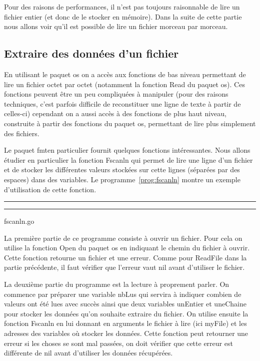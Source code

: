 \documentclass[a4paper]{article}
\newcounter{saveFootnote}
\newcommand{\sourcecode}[3]{\begin{figprog}\begin{center}\begin{minipage}{10cm}\par\noindent\rule{\textwidth}{0.4pt}\par\noindent\rule{\textwidth}{0.4pt}\end{minipage}\end{center}\caption{#1}\label{#3}\end{figprog}}
\newcommand{\inlinecode}[1]{\textsf{#1}}
\begin{document}
Pour des raisons de performances, il n'est pas toujours raisonnable de lire un fichier entier (et donc de le stocker en mémoire).
Dans la suite de cette partie nous allons voir qu'il est possible de lire un fichier morceau par morceau.

\subsection{Extraire des données d'un fichier}

En utilisant le paquet \inlinecode{os} on a accès aux fonctions de bas niveau permettant de lire un fichier octet par octet (notamment la fonction \inlinecode{Read} du paquet \inlinecode{os}).
Ces fonctions peuvent être un peu compliquées à manipuler (pour des raisons techniques, c'est parfois difficile de reconstituer une ligne de texte à partir de celles-ci) cependant on a aussi accès à des fonctions de plus haut niveau, construite à partir des fonctions du paquet \inlinecode{os}, permettant de lire plus simplement des fichiers.

Le paquet \inlinecode{fmt}\footnotemark en particulier fournit quelques fonctions intéressantes.
Nous allons étudier en particulier la fonction \inlinecode{Fscanln} qui permet de lire une ligne d'un fichier et de stocker les différentes valeurs stockées sur cette lignes (séparées par des espaces) dans des variables.
Le programme~\ref{prog:fscanln} montre un exemple d'utilisation de cette fonction.

\sourcecode{fscanln.go}{Extraction de données d'un fichier en Go}{prog:fscanln}

La première partie de ce programme consiste à ouvrir un fichier.
Pour cela on utilise la fonction \inlinecode{Open} du paquet \inlinecode{os} en indiquant le chemin du fichier à ouvrir.
Cette fonction retourne un fichier et une erreur.
Comme pour \inlinecode{ReadFile} dans la partie précédente, il faut vérifier que l'erreur vaut \inlinecode{nil} avant d'utiliser le fichier.

La deuxième partie du programme est la lecture à proprement parler.
On commence par préparer une variable \inlinecode{nbLus} qui servira à indiquer combien de valeurs ont été lues avec succès ainsi que deux variables \inlinecode{unEntier} et \inlinecode{uneChaine} pour stocker les données qu'on souhaite extraire du fichier.
On utilise ensuite la fonction \inlinecode{Fscanln} en lui donnant en arguments le fichier à lire (ici \inlinecode{myFile}) et les adresses des variables où stocker les données.
Cette fonction peut retourner une erreur si les choses se sont mal passées, on doit vérifier que cette erreur est différente de \inlinecode{nil} avant d'utiliser les données récupérées.
\end{document}
